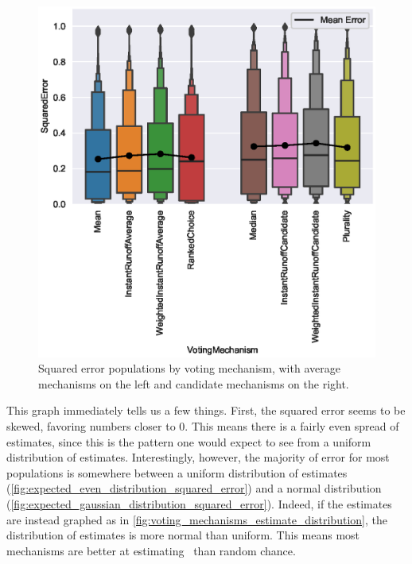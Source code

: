 \begin{figure}[htbp]
    \centering
    \includegraphics[scale=0.75]
    {./content/figures/voting_mechanisms/voting_mechanisms_comparison}
    \caption{Squared error populations by voting mechanism, with average
    mechanisms on the left and candidate mechanisms on the right.}
    \label{fig:voting-mechanisms-comparison}
\end{figure}


This graph immediately tells us a few things.
First, the squared error seems to be skewed, favoring numbers closer to 0.
This means there is a fairly even spread of estimates, since this is the
pattern one would expect to see from a uniform distribution of estimates.
Interestingly, however, the majority of error for most populations is
somewhere between a uniform distribution of estimates
(\autoref{fig:expected_even_distribution_squared_error}) and a normal
distribution (\autoref{fig:expected_gaussian_distribution_squared_error}).
Indeed, if the estimates are instead graphed as in
\autoref{fig:voting_mechanisms_estimate_distribution}, the distribution of estimates
is more normal than uniform.
This means most mechanisms are better at estimating \truth\ than random chance.

